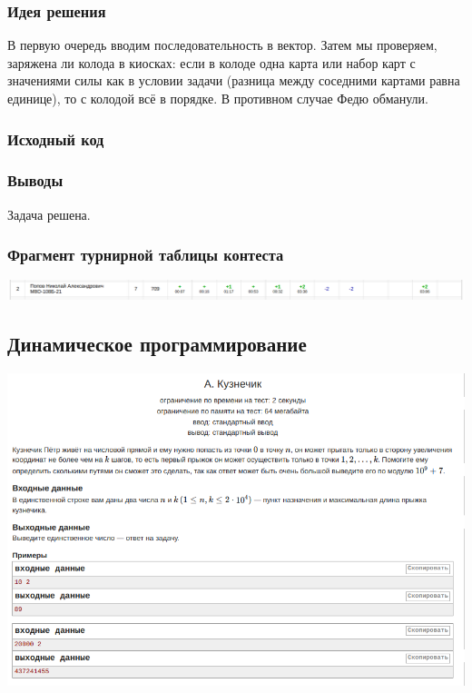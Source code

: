 \subsubsection*{Идея решения}

В первую очередь вводим последовательность в вектор. Затем мы проверяем, заряжена ли колода в киосках: если в колоде одна карта или набор карт с значениями силы как в условии задачи (разница между соседними картами равна единице), то с колодой всё в порядке. В противном случае Федю обманули.

\subsubsection*{Исходный код}


\subsubsection*{Выводы}
Задача решена.
\newline

\subsubsection*{Фрагмент турнирной таблицы контеста}
\begin{center}
\includegraphics[width=\textwidth]{standings/Contest2.png}\newline\noindent
\end{center}


\subsection*{Динамическое программирование}

\begin{center}
\includegraphics[width=\textwidth]{statements/Contest3A.png}
\end{center}

